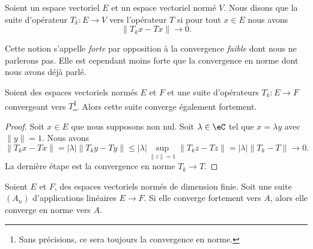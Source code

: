 \begin{definition}       \label{DEFooNREQooElLvec}
	Soient un espace vectoriel \( E\) et un espace vectoriel normé \( V\). Nous disons que la suite d'opérateur \( T_k\colon E\to V\)  vers l'opérateur \( T\) si pour tout \( x\in E\) nous avons
	\begin{equation}
		\| T_kx-Tx \|\to 0.
	\end{equation}
\end{definition}

Cette notion s'appelle \emph{forte} par opposition à la convergence \emph{faible} dont nous ne parlerons pas. Elle est cependant moins forte que la convergence en norme dont nous avons déjà parlé.

\begin{proposition}     \label{PROPooRFBLooUjSirP}
	Soient des espaces vectoriels normés \( E\) et \( F\) et une suite d'opérateurs \( T_k\colon E\to F\) convergeant vers \( T\)\footnote{Sans précisions, ce sera toujours la convergence en norme.}. Alors cette suite converge également fortement.
\end{proposition}

\begin{proof}
	Soit \( x\in E\) que nous supposons non nul. Soit \( \lambda\in \eC\) tel que \( x=\lambda y\) avec \( \| y \|=1\). Nous avons
	\begin{equation}
		\| T_kx-Tx \|=| \lambda |\| T_ky-Ty \|\leq | \lambda |\sup_{\| z \|=1}\| T_kz-Tz \|=| \lambda |\| T_k-T \|\to 0.
	\end{equation}
	La dernière étape est la convergence en norme \( T_k\to T\).
\end{proof}

\begin{proposition}
	Soient \( E\) et \( F\), des espaces vectoriels normés de dimension finie. Soit une suite \( (A_n)\) d'applications linéaires \( E\to F\). Si elle converge fortement vers \( A\), alors elle converge en norme vers \( A\).
\end{proposition}

